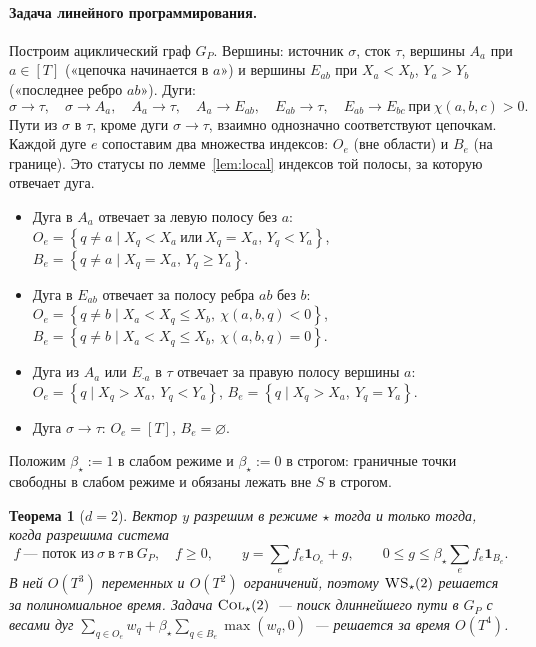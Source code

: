 \documentclass[a4paper,11pt]{article}
\theoremstyle{plain}
\newtheorem{theorem}{Теорема}[section]
\theoremstyle{definition}
\theoremstyle{remark}
\newcommand{\set}[1]{\left\{ #1 \right\}}
\newcommand{\WS}{\textsc{WS}}
\newcommand{\COL}{\textsc{Col}}
\begin{document}
\paragraph{Задача линейного программирования.} Построим ациклический граф $G_P$. Вершины: источник $\sigma$, сток $\tau$, вершины $A_a$ при $a\in[T]$ («цепочка начинается в $a$») и вершины $E_{ab}$ при $X_a<X_b$, $Y_a>Y_b$ («последнее ребро $ab$»). Дуги:
\[
    \sigma\to\tau,\quad \sigma\to A_a,\quad A_a\to\tau,\quad A_a\to E_{ab},\quad E_{ab}\to\tau,\quad E_{ab}\to E_{bc}\ \text{при}\ \chi(a,b,c)>0.
\]
Пути из $\sigma$ в $\tau$, кроме дуги $\sigma\to\tau$, взаимно однозначно соответствуют цепочкам. Каждой дуге $e$ сопоставим два множества индексов: $O_e$ (вне области) и $B_e$ (на границе). Это статусы по лемме~\ref{lem:local} индексов той полосы, за которую отвечает дуга.
\begin{itemize}
    \item Дуга в $A_a$ отвечает за левую полосу без $a$: $O_e=\set{q\ne a\mid X_q<X_a\ \text{или}\ X_q=X_a,\,Y_q<Y_a}$, $B_e=\set{q\ne a\mid X_q=X_a,\,Y_q\ge Y_a}$.
    \item Дуга в $E_{ab}$ отвечает за полосу ребра $ab$ без $b$: $O_e=\set{q\ne b\mid X_a<X_q\le X_b,\ \chi(a,b,q)<0}$, $B_e=\set{q\ne b\mid X_a<X_q\le X_b,\ \chi(a,b,q)=0}$.
    \item Дуга из $A_a$ или $E_{\cdot a}$ в $\tau$ отвечает за правую полосу вершины $a$: $O_e=\set{q\mid X_q>X_a,\ Y_q<Y_a}$, $B_e=\set{q\mid X_q>X_a,\ Y_q=Y_a}$.
    \item Дуга $\sigma\to\tau$: $O_e=[T]$, $B_e=\varnothing$.
\end{itemize}
Положим $\beta_\star:=1$ в слабом режиме и $\beta_\star:=0$ в строгом: граничные точки свободны в слабом режиме и обязаны лежать вне $S$ в строгом.

\begin{theorem}[$d=2$]\label{thm:d2}
    Вектор $y$ разрешим в режиме $\star$ тогда и только тогда, когда разрешима система
    \[
        f\ \text{--- поток из}\ \sigma\ \text{в}\ \tau\ \text{в}\ G_P,\quad f\ge0,\qquad y=\sum_ef_e\mathbf 1_{O_e}+g,\qquad 0\le g\le\beta_\star\sum_ef_e\mathbf 1_{B_e}.
    \]
    В ней $O(T^3)$ переменных и $O(T^2)$ ограничений, поэтому $\WS_\star(2)$ решается за полиномиальное время. Задача $\COL_\star(2)$~--- поиск длиннейшего пути в $G_P$ с весами дуг $\sum_{q\in O_e}w_q+\beta_\star\sum_{q\in B_e}\max(w_q,0)$~--- решается за время $O(T^4)$.
\end{theorem}
\end{document}
